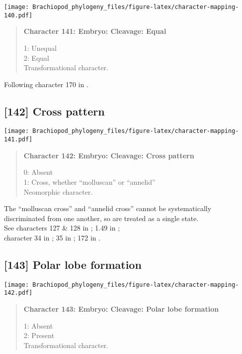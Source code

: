 \documentclass[openany]{book}
\theoremstyle{definition}
\theoremstyle{definition}
\theoremstyle{definition}
\theoremstyle{remark}
\begin{document}
\texttt{[image: Brachiopod\_phylogeny\_files/figure-latex/character-mapping-140.pdf]}

\begin{quote}
\textbf{Character 141: Embryo: Cleavage: Equal}

1: Unequal\\
2: Equal\\
Transformational character.
\end{quote}

Following character 170 in \citet{Giribet2002}.

\subsection*{{[}142{]} Cross pattern}\label{cross-pattern}

\texttt{[image: Brachiopod\_phylogeny\_files/figure-latex/character-mapping-141.pdf]}

\begin{quote}
\textbf{Character 142: Embryo: Cleavage: Cross pattern}

0: Absent\\
1: Cross, whether ``molluscan'' or ``annelid''\\
Neomorphic character.
\end{quote}

The ``molluscan cross'' and ``annelid cross'' cannot be systematically
discriminated from one another, so are treated as a single state.\\
See characters 127 \& 128 in \citet{Rouse1999}; 1.49 in
\citet{SPS1996};\\
character 34 in \citet{Haszprunar1996}; 35 in \citet{Haszprunar2000};
172 in \citet{Giribet2002}.

\subsection*{{[}143{]} Polar lobe formation}\label{polar-lobe-formation}

\texttt{[image: Brachiopod\_phylogeny\_files/figure-latex/character-mapping-142.pdf]}

\begin{quote}
\textbf{Character 143: Embryo: Cleavage: Polar lobe formation}

1: Absent\\
2: Present\\
Transformational character.
\end{quote}
\end{document}
